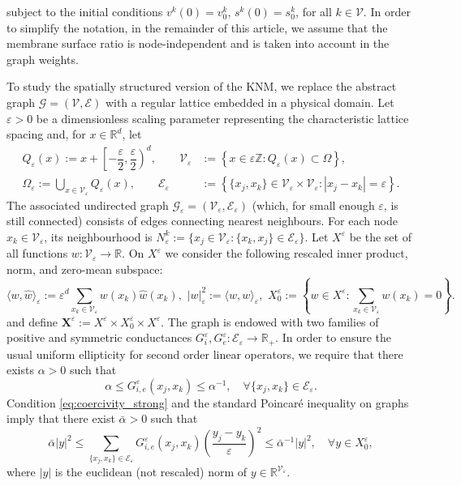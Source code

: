 \documentclass[a4paper,11pt]{article}
\theoremstyle{definition}
\numberwithin{equation}{section}
\newcommand{\e}{\varepsilon}
\newcommand{\R}{\mathbb{R}}
\newcommand{\V}{\mathcal{V}}
\begin{document}
subject to the initial conditions
$v^k(0)=v_0^k$, $s^k(0)=s_0^k$,
for all $k\in \V$. In order to simplify the notation, in the remainder of this article, we assume that the membrane surface ratio is node-independent and is taken into account in the graph weights. %


To study the spatially structured version of the KNM, we replace the abstract graph $\mathcal{G}=(\V,\mathcal{E})$ with a regular lattice embedded in a physical domain. Let $\e > 0$ be a dimensionless scaling parameter representing the characteristic lattice spacing and, for $x\in \R^d$, let
\begin{align}
	Q_\e(x):=x+  \left[-\dfrac{\e}{2},\dfrac{\e}{2}\right)^d,\qquad \V_\e&:= \left\{x\in \e\mathbb{Z} :  Q_\e(x) \subset \Omega\right\},\label{def:graph_e1}\\
	\Omega_\e:=\bigcup_{x\in \V_\e} Q_\e(x),\qquad
	\mathcal{E_{\e}}&:=\left\{ \{x_j,x_k\}\in \V_\e\times \V_\e: 
	|x_j - x_k|=\e\right\}.\label{def:graph_e2}
\end{align}
The associated undirected graph $\mathcal{G}_\e=(\V_\e,\mathcal{E_{\e}})$ (which, for small enough $\e$, is still connected) consists of edges connecting nearest neighbours. For each node $x_{k}\in \V_\e$, its neighbourhood is $N_{\e}^{k}:=\{x_{j}\in \V_\e: \{x_k,x_j\} \in \mathcal{E_{\e}}\}$. Let $X^\e$ be the set of all functions $w:\V_\e \to \R$. On $X^\e$ we consider the following rescaled inner product, norm, and zero-mean subspace:
\[
\langle w, \widehat w\rangle_\e
:= \e^d \!\!\!\!\sum_{x_k\in\V_\e} w(x_k) \widehat w(x_k), \,\, |w|^2_\e:=\langle w, w\rangle_\e,    \,\, X^{\e}_0:= \left\{ w\in X^\e : \sum_{x_k\in\V_\e} w(x_k) = 0\right\}.
\]	
and define $\mathbf{X}^\e:=X^\e \times X_0^\e \times X^\e$. The graph is endowed with two families of positive and symmetric conductances $G_i^\e,G_e^\e: \mathcal{E}_\e \to \R_+$. In order to ensure the usual uniform ellipticity for second order linear operators, we require that there exists $\alpha>0$ such that
\begin{equation}
	\label{eq:coercivity_strong}
	\alpha \leq  G_{i,e}^\e(x_j,x_k) \leq \alpha^{-1},\quad \forall  \{x_j,x_k\}\in \mathcal{E}_\e.
\end{equation}
Condition \eqref{eq:coercivity_strong} and the standard Poincar\'e inequality on graphs imply that there exist $\bar \alpha >0$ such that
\begin{equation}
	\label{eq:coercivity}
	\bar \alpha|y|^2 \leq \sum_{\{x_j,x_k\}\in \mathcal{E}_\e} G_{i,e}^\e(x_j,x_k)\left(\frac{y_j-y_k}{\e}\right)^2 \leq \bar \alpha^{-1}|y|^2,\quad \forall y \in X_0^\e,
\end{equation}
where $|y|$ is the euclidean (not rescaled) norm of $y \in \R^{\V_\e}$.
\end{document}
